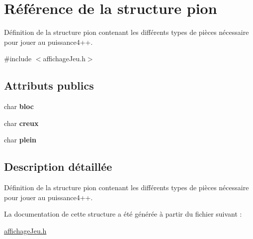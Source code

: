 \hypertarget{structpion}{\section{\-Référence de la structure pion}
\label{structpion}
}


\-Définition de la structure pion contenant les différents types de pièces nécessaire pour jouer au puissance4++.  




{\ttfamily \#include $<$affichage\-Jeu.\-h$>$}

\subsection*{\-Attributs publics}
\begin{DoxyCompactItemize}
\item 
\hypertarget{structpion_ab5400751934ebf8ef89b212adc5d34c6}{char {\bfseries bloc}}\label{structpion_ab5400751934ebf8ef89b212adc5d34c6}

\item 
\hypertarget{structpion_a8658c6bdef5d05149b8ccef566bd8125}{char {\bfseries creux}}\label{structpion_a8658c6bdef5d05149b8ccef566bd8125}

\item 
\hypertarget{structpion_a8af89c0be5d10e36d1e30ed912a75a50}{char {\bfseries plein}}\label{structpion_a8af89c0be5d10e36d1e30ed912a75a50}

\end{DoxyCompactItemize}


\subsection{\-Description détaillée}
\-Définition de la structure pion contenant les différents types de pièces nécessaire pour jouer au puissance4++. 

\-La documentation de cette structure a été générée à partir du fichier suivant \-:\begin{DoxyCompactItemize}
\item 
\hyperlink{affichageJeu_8h}{affichage\-Jeu.\-h}\end{DoxyCompactItemize}
